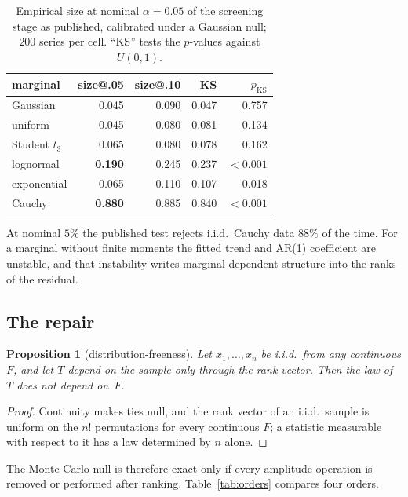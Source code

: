 \documentclass[11pt]{article}
\newtheorem{proposition}{Proposition}
\begin{document}
\begin{table}[h]
\centering
\caption{Empirical size at nominal $\alpha=0.05$ of the screening stage as
published, calibrated under a Gaussian null; $200$ series per cell. ``KS'' tests
the $p$-values against $U(0,1)$.}
\label{tab:pivot}
\begin{tabular}{lrrrr}
\toprule
marginal & size@.05 & size@.10 & KS & $p_{\mathrm{KS}}$ \\
\midrule
Gaussian      & 0.045 & 0.090 & 0.047 & 0.757 \\
uniform       & 0.045 & 0.080 & 0.081 & 0.134 \\
Student $t_3$ & 0.065 & 0.080 & 0.078 & 0.162 \\
lognormal     & \textbf{0.190} & 0.245 & 0.237 & $<0.001$ \\
exponential   & 0.065 & 0.110 & 0.107 & 0.018 \\
Cauchy        & \textbf{0.880} & 0.885 & 0.840 & $<0.001$ \\
\bottomrule
\end{tabular}
\end{table}

\noindent
At nominal $5\%$ the published test rejects i.i.d.\ Cauchy data $88\%$ of the
time. For a marginal without finite moments the fitted trend and AR(1)
coefficient are unstable, and that instability writes marginal-dependent
structure into the ranks of the residual.

\subsection{The repair}

\begin{proposition}[distribution-freeness]
\label{prop:pivot}
Let $x_1,\dots,x_n$ be i.i.d.\ from any continuous $F$, and let $T$ depend on
the sample only through the rank vector. Then the law of $T$ does not depend
on~$F$.
\end{proposition}

\begin{proof}
Continuity makes ties null, and the rank vector of an i.i.d.\ sample is uniform
on the $n!$ permutations for every continuous $F$; a statistic measurable with
respect to it has a law determined by $n$ alone.
\end{proof}

\noindent
The Monte-Carlo null is therefore exact only if every amplitude operation is
removed or performed after ranking. Table~\ref{tab:orders} compares four orders.
\end{document}
